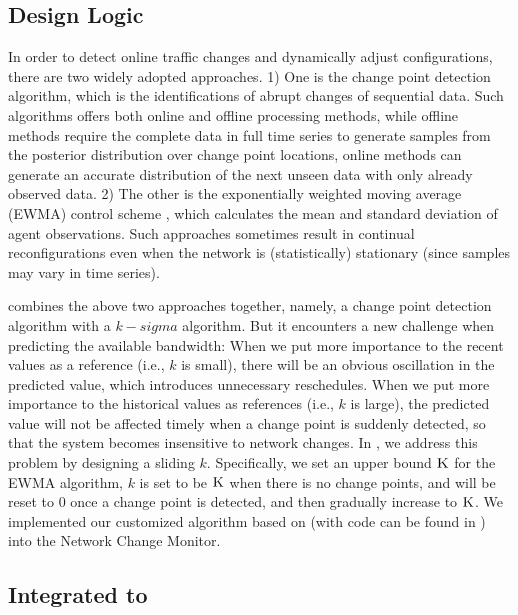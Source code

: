 {\subsection{Design Logic}
\label{subsec:dynamic:prediction}
In order to detect online traffic changes and dynamically adjust configurations, there are two widely adopted approaches. 1) One is the change point detection algorithm, which is the identifications of abrupt changes of sequential data. Such algorithms offers both online and offline processing methods, while offline methods \cite{smith1975bayesian,stephens1994bayesian,barry1993bayesian,green1995reversible} require the complete data in full time series to generate samples from the posterior distribution over change point locations, online methods \cite{page1955test,desobry2005online,lorden1971procedures} can generate an accurate distribution of the next unseen data with only already observed data. 2) The other is the exponentially weighted moving average (EWMA) control scheme \cite{roberts1959control,lucas1990exponentially}, which calculates the mean and standard deviation of agent observations. Such approaches sometimes result in continual reconfigurations even when the network is (statistically) stationary (since samples may vary in time series).

\newname combines the above two approaches together, namely, a change point detection algorithm \cite{adams2007bayesian} with a $k-sigma$ algorithm. But it encounters a new challenge when predicting the available bandwidth: When we put more importance to the recent values as a reference (i.e., $k$ is small), there will be an obvious oscillation in the predicted value, which introduces unnecessary reschedules. When we put more importance to the historical values as references (i.e., $k$ is large), the predicted value will not be affected timely when a change point is suddenly detected, so that the system becomes insensitive to network changes. In \newname, we address this problem by designing a sliding $k$. Specifically, we set an upper bound $\textsc{K}$ for the EWMA algorithm, $k$ is set to be $\textsc{K}$ when there is no change points, and will be reset to $0$ once a change point is detected, and then gradually increase to $\textsc{K}$. We implemented our customized algorithm based on \cite{adams2007bayesian} (with code can be found in \cite{BOCDcode}) into the Network Change Monitor.

\subsection{Integrated to \name}
}
